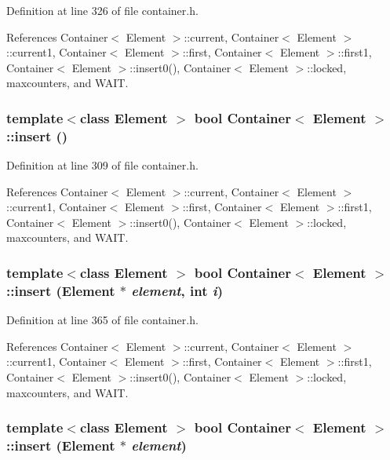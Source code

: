 Definition at line 326 of file container.h.

References Container$<$ Element $>$::current, Container$<$ Element $>$::current1, Container$<$ Element $>$::first, Container$<$ Element $>$::first1, Container$<$ Element $>$::insert0(), Container$<$ Element $>$::locked, maxcounters, and WAIT.\hypertarget{classContainer_24b33c814770997bbe712dbfcba96452}{
\subsubsection[{insert}]{\setlength{\rightskip}{0pt plus 5cm}template$<$class Element $>$ bool {\bf Container}$<$ Element $>$::insert ()}}
\label{classContainer_24b33c814770997bbe712dbfcba96452}




Definition at line 309 of file container.h.

References Container$<$ Element $>$::current, Container$<$ Element $>$::current1, Container$<$ Element $>$::first, Container$<$ Element $>$::first1, Container$<$ Element $>$::insert0(), Container$<$ Element $>$::locked, maxcounters, and WAIT.\hypertarget{classContainer_2250959b1216253d7487e09a71281565}{
\subsubsection[{insert}]{\setlength{\rightskip}{0pt plus 5cm}template$<$class Element $>$ bool {\bf Container}$<$ Element $>$::insert (Element $\ast$ {\em element}, \/  int {\em i})}}
\label{classContainer_2250959b1216253d7487e09a71281565}




Definition at line 365 of file container.h.

References Container$<$ Element $>$::current, Container$<$ Element $>$::current1, Container$<$ Element $>$::first, Container$<$ Element $>$::first1, Container$<$ Element $>$::insert0(), Container$<$ Element $>$::locked, maxcounters, and WAIT.\hypertarget{classContainer_f4933701adc01824582191fdceb1c69c}{
\subsubsection[{insert}]{\setlength{\rightskip}{0pt plus 5cm}template$<$class Element $>$ bool {\bf Container}$<$ Element $>$::insert (Element $\ast$ {\em element})}}
\label{classContainer_f4933701adc01824582191fdceb1c69c}




